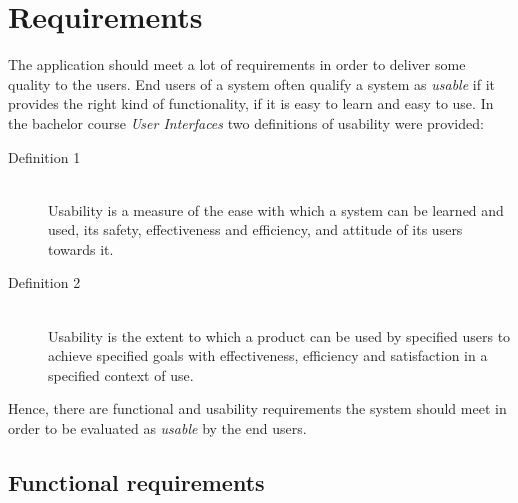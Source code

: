 \chapter{Requirements}\label{ch:requirements}

The application should meet a lot of requirements in order to deliver some quality to the users. End users of a system often qualify a system as \textit{usable} if it provides the right kind of functionality, if it is easy to learn and easy to use.
In the bachelor course \textit{User Interfaces} \citep{ui_course_detroyer} two definitions of usability were provided:
\begin{description}
	\item[Definition 1] \hfill \\
	Usability is a measure of the ease with which a system can be learned and used, its safety, effectiveness and efficiency, and attitude of its users towards it.

	\item[Definition 2] \hfill \\
	Usability is the extent to which a product can be used by specified users to achieve specified goals with effectiveness, efficiency and satisfaction in a specified context of use.
\end{description}

Hence, there are functional and usability requirements the system should meet in order to be evaluated as \textit{usable} by the end users.

\section{Functional requirements}\label{sec:functional-requirements}

